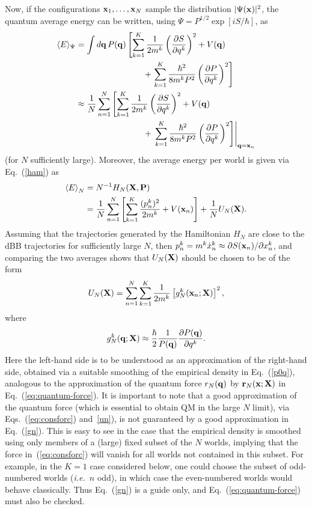 \documentclass[twocolumn,aps,pra,amsmath,amssymb,superscriptaddress]{revtex4}
\newcommand{\ie}{{\em i.e.}}
\newcommand{\nn}{\nonumber}
\newcommand{\erf}[1]{Eq.~(\ref{#1})}
\newcommand{\an}[1]{\left\langle{#1}\right\rangle}
\renewcommand{\(}{\left(}
\renewcommand{\)}{\right)}
\newcommand{\red}{\color{red}}
\newcommand{\blk}{\color{black}}
\newcommand{\blu}{\color{blue}}
\renewcommand\blu{\blk}
\renewcommand\red{\blk}
\begin{document}
 Now, if the configurations ${\bf x}_1,\dots,{\bf x}_N$ sample the distribution $|\Psi({\bf x})|^2$, the quantum average energy can be written, using $\Psi=P^{1/2}\exp[iS/\hbar]$, as \blk \cite{dbb}
\begin{align} \label{avq} \nn
\langle E\rangle_{\Psi} &= \int d{\bf q}\, P({\bf q})\left[\sum_{k=1}^K \frac{1}{2m^k}\left(\frac{\partial S}{\partial q^k}\right)^2+ V({\bf q}) \right.\\ \nn
&~~~~~~~~~~~~~~~~~~~~~~~~+ \left. \sum_{k=1}^K \frac{\hbar^2}{8m^k P^2} \left( \frac{\partial P}{\partial q^k}\right)^2 \right]  \\ \nn
&\approx \frac{1}{N}\sum_{n=1}^N  \left[\sum_{k=1}^K \frac{1}{2m^k}\left(\frac{\partial S}{\partial q^k}\right)^2+ V({\bf q}) \right.\\ \nn
&~~~~~~~~~~~~~~~~~~~~~~~~+ \left. \left. \sum_{k=1}^K \frac{\hbar^2}{8m^k P^2} \left( \frac{\partial P}{\partial q^k}\right)^2 \right]  \right|_{{\bf q}={\bf x}_n}
\end{align}
(for $N$ sufficiently large).  Moreover, the average energy per world is given
via Eq.~(\ref{ham}) \blk as 
\begin{align} \nn
\an{E}_{N} \blk &= N^{-1}H_N({\bf X},{\bf P}) \\
&= \frac{1}{N}\sum_{n=1}^N\left[\sum_{k=1}^K \frac{(p^k_n)^2}{2m^k} +  V({\bf x}_n)\right] + \frac{1}{N} U_N({\bf X}). \nn
\end{align}
Assuming that the trajectories generated by  the Hamiltonian $H_N$  are close to the dBB trajectories for sufficiently large $N$, then  $p^k_n=m^k\dot{x}^k_n\approx \partial S({\bf x}_n)/\partial x^k_n$, and comparing the two averages shows that $U_N({\bf X})$ should be chosen to be of the form
\begin{equation} \label{un}
U_N({\bf X}) = \sum_{n=1}^N \sum_{k=1}^K \frac{1}{2m^k}   \left[ g_N^k({\bf x}_n;{\bf X})\right]^2 ,
\end{equation}
where 
\begin{equation} \label{gn} 
g_N^k({\bf q} ;{\bf X})  \approx \frac{\hbar}{2}\frac{1}{P({\bf q})} \frac{\partial P({\bf q})}{\partial q^k} .
\end{equation}
Here the left-hand side is to be understood as an approximation of the right-hand side, \blk 
obtained  via a suitable smoothing of the empirical density in  
Eq.~(\ref{p0q})\blk , analogous to the approximation of the quantum force $r_N({\bf q})$ by ${\bf r}_N({\bf x};{\bf X})$ in Eq.~(\ref{eq:quantum-force}). 
It is important to note that a good approximation of the \blu quantum \blk force (which is essential to obtain QM in the large $N$ limit), \blu via Eqs.~(\ref{eq:consforc}) and~\ref{un}), \blk
is not guaranteed by a good approximation in \erf{gn}. \blu This is easy to see  in the case that
the empirical density is smoothed using only members of a (large) fixed subset of the $N$ worlds, implying that the  \blu
force in~(\ref{eq:consforc}) will vanish for all worlds not contained in this subset. \red For example, 
in the $K=1$ case considered below, one could choose the subset of  odd-numbered 
worlds (\ie~$n$ odd), in which case the even-numbered worlds would behave classically.  
\blk Thus \erf{gn} is a guide only, and \erf{eq:quantum-force} must also be checked. \blk
\end{document}
